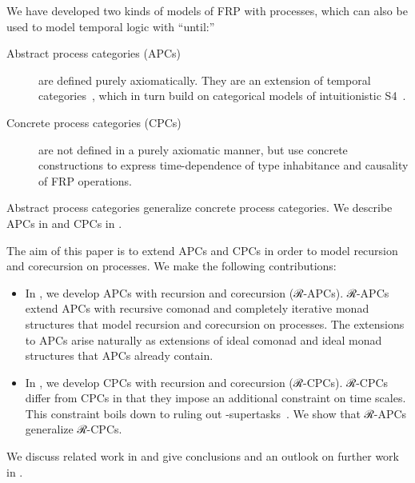 \documentclass[copyright,creativecommons]{eptcs}
\begin{document}
We have developed two kinds of models of FRP with processes, which can also be
used to model temporal logic with “until:”
\begin{description}

\item[Abstract process categories (APCs)~\cite{jeltsch:plpv-2014}]

are defined purely axiomatically. They are an extension of temporal
categories~\cite{jeltsch:entcs-286}, which in turn build on categorical models
of intuitionistic S4~\cite{kobayashi:tcs-175-1,bierman:sl-65-3}.

\item[Concrete process categories (CPCs)~\cite{jeltsch:plpv-2013}]

are not defined in a purely axiomatic manner, but use concrete constructions to
express time-dependence of type inhabitance and causality of FRP operations.

\end{description}
Abstract process categories generalize concrete process categories. We describe
APCs in  and CPCs in
.

The aim of this paper is to extend APCs and CPCs in order to model recursion and
corecursion on processes. We make the following contributions:
\begin{itemize}

\item

In , we develop APCs with
recursion and corecursion (ℛ-APCs). ℛ-APCs extend APCs with recursive comonad
and completely iterative monad structures that model recursion and corecursion
on processes. The extensions to APCs arise naturally as extensions of ideal
comonad and ideal monad structures that APCs already contain.

\item

In , we develop CPCs with
recursion and corecursion (ℛ-CPCs). ℛ-CPCs differ from CPCs in that they impose
an additional constraint on time scales. This constraint boils down to ruling
out -supertasks~\cite{laraudogoitia:supertasks}. We show that ℛ-APCs
generalize ℛ-CPCs.

\end{itemize}

We discuss related work in  and give conclusions and an
outlook on further work in .
\end{document}
